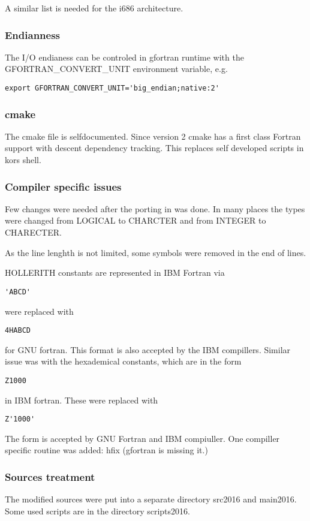 A similar list is needed for the i686 architecture.



\subsubsection{Endianness}
The I/O endianess  can be controled in gfortran runtime with the 
GFORTRAN\_CONVERT\_UNIT environment variable, e.g.
\begin{verbatim}
export GFORTRAN_CONVERT_UNIT='big_endian;native:2'
\end{verbatim}

\subsubsection{cmake}
The cmake file is selfdocumented.
Since version 2 cmake  has a first class Fortran support with descent dependency tracking.
This replaces self developed scripts in kors shell.

\subsubsection{Compiler specific issues}
Few changes were needed after the porting in   was done.
In many places the types were changed from LOGICAL to CHARCTER
and from INTEGER to CHARECTER.

As the line lenghth is not limited, some symbols were removed in the end of lines.

HOLLERITH constants are represented in IBM Fortran via
\begin{verbatim}
'ABCD'
\end{verbatim}
were replaced with
\begin{verbatim}
4HABCD
\end{verbatim}
for GNU fortran. This format is also accepted by the IBM compillers.
Similar issue was with the hexademical constants, which are in the form 
\begin{verbatim}
Z1000
\end{verbatim}
in IBM fortran. These were replaced with 
\begin{verbatim}
Z'1000'
\end{verbatim}
The form is accepted by GNU Fortran and IBM compiuller.
One compiller specific routine was added: hfix (gfortran is missing it.)

\subsubsection{Sources treatment}
The modified  sources were put into a separate directory src2016 and main2016.
Some used scripts are in the directory scripts2016.


